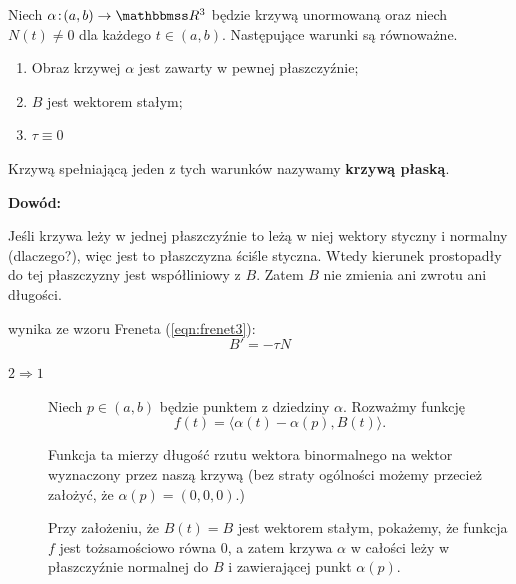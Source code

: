 \begin{frame}[<+->]

\begin{lemat}
Niech $\alpha\colon (a,b)\to \R^3$ będzie krzywą unormowaną oraz niech $N(t)\neq 0$ dla każdego $t\in (a,b)$. Następujące warunki są równoważne.
\begin{enumerate}
\item Obraz krzywej $\alpha$ jest zawarty w pewnej płaszczyźnie;
\item $B$ jest wektorem stałym;
\item $\tau\equiv 0$
\end{enumerate}

\end{lemat}

\begin{uwaga}
Krzywą spełniającą jeden z tych warunków nazywamy \textbf{krzywą płaską}.
\end{uwaga}

\end{frame}
\begin{frame}

\textcolor{ared}{\textbf{Dowód:}}\pause \\
\begin{description}[<+->]
\item [$1\Rightarrow 2$] Jeśli krzywa leży w jednej płaszczyźnie to leżą w niej wektory styczny i normalny (dlaczego?), więc jest to płaszczyzna ściśle styczna. Wtedy kierunek prostopadły do tej płaszczyzny jest współliniowy z $B$. Zatem $B$ nie zmienia ani zwrotu ani długości.
\item [$2\Leftrightarrow 3$] wynika ze wzoru Freneta (\ref{eqn:frenet3}):
\[B'=-\tau N\]
\end{description}

\end{frame}
\begin{frame}[<+->]
\begin{description}
\item [$2\Rightarrow 1$] Niech $p\in (a,b)$ będzie punktem z dziedziny $\alpha$. 
Rozważmy funkcję
\[f(t)=\langle \alpha(t)-\alpha(p),B(t)\rangle.\]

Funkcja ta mierzy długość rzutu wektora binormalnego na wektor wyznaczony przez naszą krzywą (bez straty ogólności możemy przecież założyć, że $\alpha(p)=(0,0,0)$.) 

Przy założeniu, że $B(t)=B$ jest wektorem stałym, pokażemy, że funkcja $f$ jest tożsamościowo równa $0$, a zatem krzywa $\alpha$ w całości leży w płaszczyźnie normalnej do $B$ i zawierającej punkt $\alpha(p)$.
\end{description}
\end{frame}
